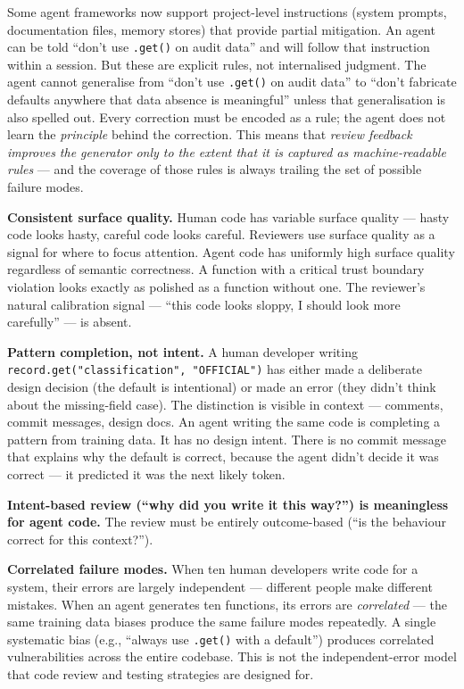 \documentclass[a4paper,11pt]{report}
\begin{document}
Some agent frameworks now support project-level instructions (system
prompts, documentation files, memory stores) that provide partial
mitigation. An agent can be told ``don't use \texttt{.get()} on audit
data'' and will follow that instruction within a session. But these are
explicit rules, not internalised judgment. The agent cannot generalise
from ``don't use \texttt{.get()} on audit data'' to ``don't fabricate
defaults anywhere that data absence is meaningful'' unless that
generalisation is also spelled out. Every correction must be encoded as
a rule; the agent does not learn the \emph{principle} behind the
correction. This means that \emph{review feedback improves the generator
only to the extent that it is captured as machine-readable rules} ---
and the coverage of those rules is always trailing the set of possible
failure modes.

\textbf{Consistent surface quality.} Human code has variable surface
quality --- hasty code looks hasty, careful code looks careful.
Reviewers use surface quality as a signal for where to focus attention.
Agent code has uniformly high surface quality regardless of semantic
correctness. A function with a critical trust boundary violation looks
exactly as polished as a function without one. The reviewer's natural
calibration signal --- ``this code looks sloppy, I should look more
carefully'' --- is absent.

\textbf{Pattern completion, not intent.} A human developer writing
\texttt{record.get("classification",\ "OFFICIAL")} has either made a
deliberate design decision (the default is intentional) or made an error
(they didn't think about the missing-field case). The distinction is
visible in context --- comments, commit messages, design docs. An agent
writing the same code is completing a pattern from training data. It has
no design intent. There is no commit message that explains why the
default is correct, because the agent didn't decide it was correct ---
it predicted it was the next likely token.

\textbf{Intent-based review (``why did you write it this way?'') is
meaningless for agent code.} The review must be entirely outcome-based
(``is the behaviour correct for this context?'').

\textbf{Correlated failure modes.} When ten human developers write code
for a system, their errors are largely independent --- different people
make different mistakes. When an agent generates ten functions, its
errors are \emph{correlated} --- the same training data biases produce
the same failure modes repeatedly. A single systematic bias (e.g.,
``always use \texttt{.get()} with a default'') produces correlated
vulnerabilities across the entire codebase. This is not the
independent-error model that code review and testing strategies are
designed for.
\end{document}
